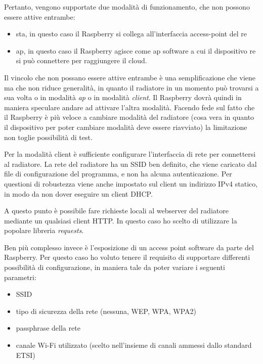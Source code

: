 \documentclass[12pt,a4paper,twoside,titlepage]{book}
\begin{document}
Pertanto, vengono supportate due modalità di funzionamento, che non possono essere
attive entrambe:
\begin{itemize}
    \item \acrshort{sta}, in questo caso il Raspberry si collega all'interfaccia
        access-point del \Gls{re}
    \item \acrshort{ap}, in questo caso il Raspberry agisce come \acrshort{ap} software
        a cui il dispositivo \Gls{re} si può connettere per raggiungere il
        cloud.
\end{itemize}

Il vincolo che non possano essere attive entrambe è una semplificazione che viene ma che
non riduce generalità, in quanto il radiatore in un momento può trovarsi a sua volta o in
modalità \textit{ap} o in modalità \textit{client}. Il Raspberry dovrà quindi in maniera
speculare andare ad attivare l'altra modalità. Facendo fede sul fatto che il Raspberry è
più veloce a cambiare modalità del radiatore (cosa vera in quanto il dispositivo per poter
cambiare modalità deve essere riavviato) la limitazione non toglie possibilità di test.

Per la modalità client è sufficiente configurare l'interfaccia di rete per connettersi
al radiatore. La rete del radiatore ha un SSID ben definito, che viene caricato dal
file di configurazione del programma, e non ha alcuna autenticazione. Per questioni
di robustezza viene anche impostato sul client un indirizzo IPv4 statico, in modo da
non dover eseguire un client DHCP.

A questo punto è possibile fare richieste locali al webserver del radiatore mediante
un qualsiasi client HTTP. In questo caso ho scelto di utilizzare la popolare
libreria \textit{requests}.

Ben più complesso invece è l'esposizione di un access point software da parte del
Raspberry. Per questo caso ho voluto tenere il requisito di supportare differenti
possibilità di configurazione, in maniera tale da poter variare i seguenti parametri:
\begin{itemize}
    \item SSID
    \item tipo di sicurezza della rete (nessuna, WEP, WPA, WPA2)
    \item passphrase della rete
    \item canale Wi-Fi utilizzato (scelto nell'insieme di canali ammessi dallo standard ETSI)
\end{itemize}
\end{document}
